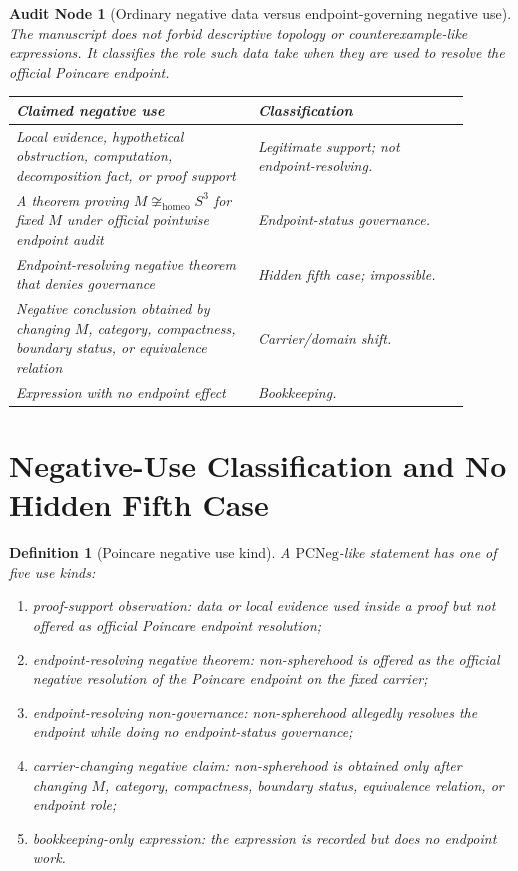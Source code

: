 \documentclass[11pt]{article}
\newtheorem{definition}[theorem]{Definition}
\newtheorem{audit}[theorem]{Audit Node}
\newcommand{\Sthree}{S^{3}}
\newcommand{\PCNeg}{\mathrm{PCNeg}}
\newcommand{\Homeo}{\cong_{\mathrm{homeo}}}
\begin{document}
\begin{audit}[Ordinary negative data versus endpoint-governing negative use]
The manuscript does not forbid descriptive topology or counterexample-like expressions. It classifies the role such data take when they are used to resolve the official Poincare endpoint.
\begin{longtable}{L{0.48\linewidth}L{0.42\linewidth}}
\toprule
\textbf{Claimed negative use} & \textbf{Classification}\\
\midrule
Local evidence, hypothetical obstruction, computation, decomposition fact, or proof support & Legitimate support; not endpoint-resolving.\\
A theorem proving \(M\not\Homeo\Sthree\) for fixed \(M\) under official pointwise endpoint audit & Endpoint-status governance.\\
Endpoint-resolving negative theorem that denies governance & Hidden fifth case; impossible.\\
Negative conclusion obtained by changing \(M\), category, compactness, boundary status, or equivalence relation & Carrier/domain shift.\\
Expression with no endpoint effect & Bookkeeping.\\
\bottomrule
\end{longtable}
\end{audit}

\section{Negative-Use Classification and No Hidden Fifth Case}\label{sec:no-fifth}

\begin{definition}[Poincare negative use kind]
A \(\PCNeg\)-like statement has one of five use kinds:
\begin{enumerate}[label=(\roman*)]
\item proof-support observation: data or local evidence used inside a proof but not offered as official Poincare endpoint resolution;
\item endpoint-resolving negative theorem: non-spherehood is offered as the official negative resolution of the Poincare endpoint on the fixed carrier;
\item endpoint-resolving non-governance: non-spherehood allegedly resolves the endpoint while doing no endpoint-status governance;
\item carrier-changing negative claim: non-spherehood is obtained only after changing \(M\), category, compactness, boundary status, equivalence relation, or endpoint role;
\item bookkeeping-only expression: the expression is recorded but does no endpoint work.
\end{enumerate}
\end{definition}
\end{document}
